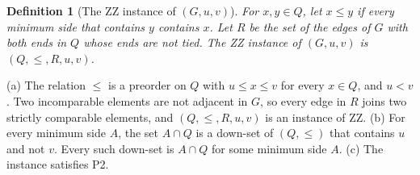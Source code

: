 \documentclass[pdflatex,sn-mathphys-num]{sn-jnl}%
\theoremstyle{thmstyleone}%
\theoremstyle{thmstyletwo}%
\theoremstyle{thmstylethree}%
\newtheorem{definition}{Definition}%
\begin{document}
\begin{definition}[The ZZ instance of $(G, u, v)$]
\label{def:zz-instance}
For $x, y \in Q$, let $x \leq y$ if every minimum side that contains $y$ contains $x$.
Let $R$ be the set of the edges of $G$ with both ends in $Q$ whose ends are not tied.
The \emph{ZZ instance of} $(G, u, v)$ is $(Q, \leq, R, u, v)$.
\end{definition}

\begin{lemma}
\label{lem:zz-instance}
(a) The relation $\leq$ is a preorder on $Q$ with $u \leq x \leq v$ for every $x \in Q$, and $u < v$.
Two incomparable elements are not adjacent in $G$, so every edge in $R$ joins two strictly comparable elements, and $(Q, \leq, R, u, v)$ is an instance of ZZ.
(b) For every minimum side $A$, the set $A \cap Q$ is a down-set of $(Q, \leq)$ that contains $u$ and not $v$.
Every such down-set is $A \cap Q$ for some minimum side $A$.
(c) The instance satisfies P2.
\end{lemma}
\end{document}
